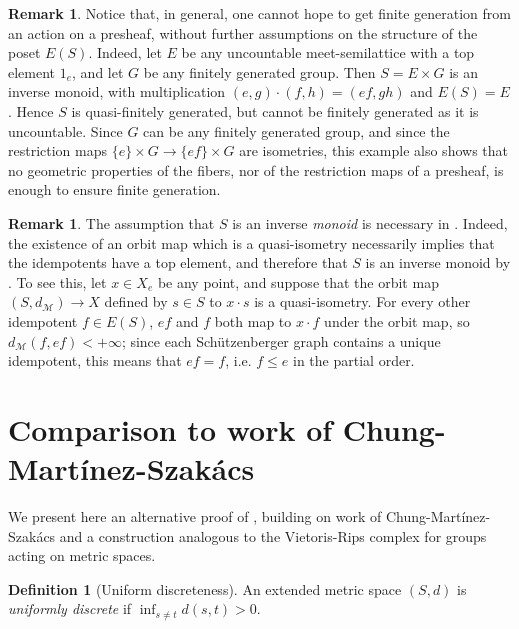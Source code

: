 \documentclass[svgnames]{amsart}
\theoremstyle{plain}
\theoremstyle{definition}
\newtheorem{defn}[thm]{Definition}
\newtheorem{rem}[thm]{Remark}
\begin{document}
\begin{rem}\label{rem:nofinitegen}
    Notice that, in general, one cannot hope to get finite generation from an action on a presheaf, without further assumptions on the structure of the poset $E(S)$. Indeed, let $E$ be any uncountable meet-semilattice with a top element $1_e$, and let $G$ be any finitely generated group. Then $S=E\times G$ is an inverse monoid, with multiplication $(e,g)\cdot(f,h)=(ef,gh)$ and $E(S)=E$. Hence $S$ is quasi-finitely generated, but cannot be finitely generated as it is uncountable. Since $G$ can be any finitely generated group, and since the restriction maps $\{e\}\times G\to \{ef\}\times G$ are isometries, this example also shows that no geometric properties of the fibers, nor of the restriction maps of a presheaf, is enough to ensure finite generation.
\end{rem}

\begin{rem} \label{rem:need_1_for_qi} 
The assumption that $S$ is an inverse \emph{monoid} is necessary in . Indeed, the existence of an orbit map which is a quasi-isometry necessarily implies that the idempotents have a top element, and therefore that $S$ is an inverse monoid by . To see this, let $x\in X_e$ be any point, and suppose that the orbit map $(S, d_{\mathcal{M}}) \to X$ defined by $s \in S$ to $x \cdot s$ is a quasi-isometry. For every other idempotent $f\in E(S)$, $ef$ and $f$ both map to $x \cdot f$ under the orbit map, so $d_{\mathcal{M}}(f,ef)<+\infty$; since each Sch\"{u}tzenberger graph contains a unique idempotent, this means that $ef=f$, i.e. $f\le e$ in the partial order.
\end{rem}


\section{Comparison to work of Chung-Martínez-Szakács}
We present here an alternative proof of , building on work of Chung-Martínez-Szakács \cite{Chung_Martinez_szakacs} and a construction analogous to the Vietoris-Rips complex for groups acting on metric spaces.

\begin{defn}[Uniform discreteness]
     An extended metric space $(S,d)$ is \emph{uniformly discrete} if $\inf_{s\neq t}d(s,t)>0$. 
\end{defn}
\end{document}
